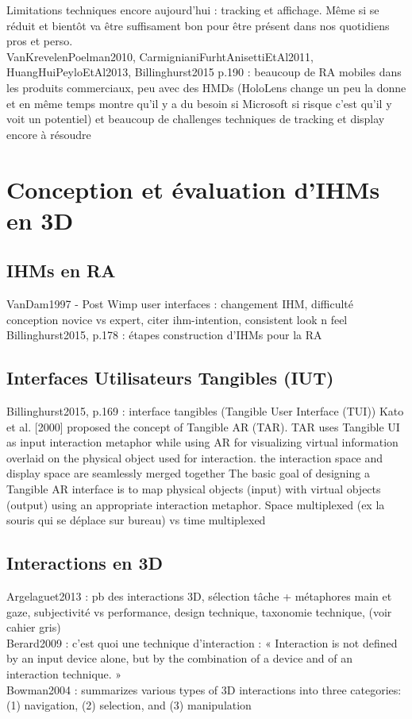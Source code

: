 Limitations techniques encore aujourd'hui : tracking et affichage. Même si se réduit et bientôt va être suffisament bon pour être présent dans nos quotidiens pros et perso.\\
VanKrevelenPoelman2010, CarmignianiFurhtAnisettiEtAl2011, HuangHuiPeyloEtAl2013, Billinghurst2015 p.190 : beaucoup de RA mobiles dans les produits commerciaux, peu avec des HMDs (HoloLens change un peu la donne et en même temps montre qu'il y a du besoin si Microsoft si risque c'est qu'il y voit un potentiel) et beaucoup de challenges techniques de tracking et display encore à résoudre


\section{Conception et évaluation d'IHMs en 3D}
\subsection{IHMs en RA}
VanDam1997 - Post Wimp user interfaces : changement IHM, difficulté conception novice vs expert, citer ihm-intention, consistent look n feel
Billinghurst2015, p.178 : étapes construction d'IHMs pour la RA

\subsection{Interfaces Utilisateurs Tangibles (IUT)}
Billinghurst2015, p.169 : interface tangibles (Tangible User Interface (TUI))
Kato et al. [2000] proposed the concept of Tangible AR (TAR). TAR uses Tangible UI as input interaction metaphor while using AR for visualizing virtual information overlaid on the physical object used for interaction. the interaction space and display space are seamlessly merged together
The basic goal of designing a Tangible AR interface is to map physical objects (input) with virtual objects (output) using an appropriate interaction metaphor.
Space multiplexed (ex la souris qui se déplace sur bureau) vs time multiplexed

\subsection{Interactions en 3D}
Argelaguet2013 : pb des interactions 3D, sélection tâche + métaphores main et gaze, subjectivité vs performance, design technique, taxonomie technique,  (voir cahier gris)\\
Berard2009 : c'est quoi une technique d'interaction : « Interaction is not defined by an input device alone, but by the combination of a device and of an interaction technique. »\\
Bowman2004 : summarizes various types of 3D interactions into three categories: (1) navigation, (2) selection, and (3)
manipulation

